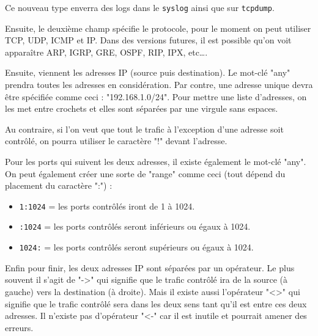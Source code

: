 \documentclass[a4paper,11pt,french]{article}
\begin{document}
Ce nouveau type enverra des logs dans le \verb+syslog+ ainsi que sur \verb+tcpdump+.

Ensuite, le deuxième champ spécifie le protocole, pour le moment on peut utiliser TCP, UDP, ICMP et IP. Dans des versions futures, il est possible qu’on voit apparaître ARP, IGRP, GRE, OSPF, RIP, IPX, etc….


Ensuite, viennent les adresses IP (source puis destination). Le mot-clé "any" prendra toutes les adresses en considération. Par contre, une adresse unique devra être spécifiée comme ceci : "192.168.1.0/24".
Pour mettre une liste d’adresses, on les met entre crochets et elles sont séparées par une virgule sans espaces.


Au contraire, si l’on veut que tout le trafic à l’exception d’une adresse soit contrôlé, on pourra utiliser le caractère "!" devant l’adresse.


Pour les ports qui suivent les deux adresses, il existe également le mot-clé "any".
On peut également créer une sorte de "range" comme ceci (tout dépend du placement du caractère ":") :
\begin{itemize}
\item \verb+1:1024+ = les ports contrôlés iront de 1 à 1024.
\item \verb+:1024+ = les ports contrôlés seront inférieurs ou égaux à 1024.
\item \verb+1024:+ = les ports contrôlés seront supérieurs ou égaux à 1024.
\end{itemize}


Enfin pour finir, les deux adresses IP sont séparées par un opérateur.
Le plus souvent il s’agit de "->" qui signifie que le trafic contrôlé ira de la source (à gauche) vers la destination (à droite).
Mais il existe aussi l’opérateur "<>" qui signifie que le trafic contrôlé sera dans les deux sens tant qu’il est entre ces deux adresses.
Il n’existe pas d’opérateur "<-" car il est inutile et pourrait amener des erreurs.
\end{document}
